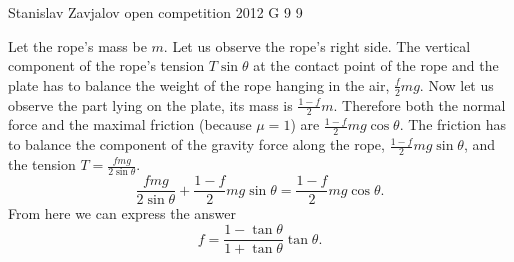 \documentclass[11pt]{article}
\begin{document}
{Stanislav Zavjalov} %
{open competition} %
{2012} %
{G 9} %
{9} %
{

\ifEngSolution
Let the rope’s mass be $m$. Let us observe the rope’s right side. The vertical component of the rope’s tension $T \sin \theta$ at the contact point of the rope and the plate has to balance the weight of the rope hanging in the air, $\frac{f}{2}mg$. Now let us observe the part lying on the plate, its mass is $\frac{1-f}{2}m$. Therefore both the normal force and the maximal friction (because $\mu = 1$) are $\frac{1-f}{2}mg \cos \theta$. The friction has to balance the component of the gravity force along the rope, $\frac{1-f}{2}mg \sin \theta$, and the tension $T=\frac{f m g}{2 \sin \theta}$. 
$$\frac{f m g}{2 \sin \theta} + \frac{1-f}{2}mg \sin \theta = \frac{1-f}{2}mg \cos \theta.$$
From here we can express the answer
$$f = \frac{1-\tan \theta}{1+\tan \theta} \tan \theta. $$
\fi
}
\end{document}
